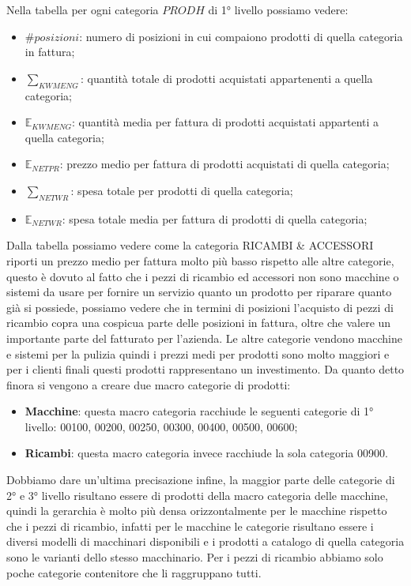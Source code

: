 Nella tabella per ogni categoria $PRODH$ di 1° livello possiamo vedere:
\begin{itemize}
	\item $\#posizioni$: numero di posizioni in cui compaiono prodotti di quella categoria in fattura;
	\item $\sum_{KWMENG}$: quantità totale di prodotti acquistati appartenenti a quella categoria;
	\item $\mathbb{E}_{KWMENG}$: quantità media per fattura di prodotti acquistati appartenti a quella categoria;
	\item $\mathbb{E}_{NETPR}$: prezzo medio per fattura di prodotti acquistati di quella categoria;
	\item $\sum_{NETWR}$: spesa totale per prodotti di quella categoria;
	\item $\mathbb{E}_{NETWR}$: spesa totale media per fattura di prodotti di quella categoria;
\end{itemize}
Dalla tabella possiamo vedere come la categoria RICAMBI \& ACCESSORI riporti un prezzo medio per fattura molto più basso rispetto alle altre categorie, questo è dovuto al fatto che i pezzi di ricambio ed accessori non sono macchine o sistemi da usare per fornire un servizio quanto un prodotto per riparare quanto già si possiede, possiamo vedere che in termini di posizioni l'acquisto di pezzi di ricambio copra una cospicua parte delle posizioni in fattura, oltre che valere un importante parte del fatturato per l'azienda. Le altre categorie vendono macchine e sistemi per la pulizia quindi i prezzi medi per prodotti sono molto maggiori e per i clienti finali questi prodotti rappresentano un investimento.
Da quanto detto finora si vengono a creare due macro categorie di prodotti:
\begin{itemize}
	\item \textbf{Macchine}: questa macro categoria racchiude le seguenti categorie di 1° livello: 00100, 00200, 00250, 00300, 00400, 00500, 00600;
	\item \textbf{Ricambi}: questa macro categoria invece racchiude la sola categoria 00900.
\end{itemize}

Dobbiamo dare un'ultima precisazione infine, la maggior parte delle categorie di 2° e 3° livello risultano essere di prodotti della macro categoria delle macchine, quindi la gerarchia è molto più densa orizzontalmente per le macchine rispetto che i pezzi di ricambio, infatti per le macchine le categorie risultano essere i diversi modelli di macchinari disponibili e i prodotti a catalogo di quella categoria sono le varianti dello stesso macchinario. Per i pezzi di ricambio abbiamo solo poche categorie contenitore che li raggruppano tutti.

